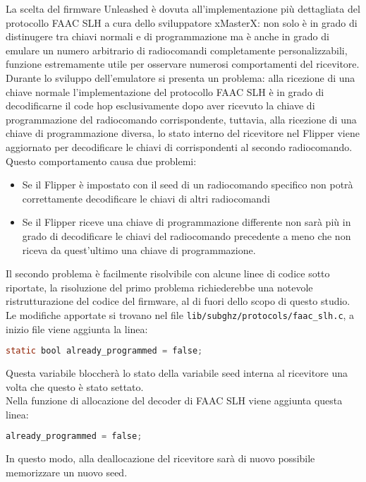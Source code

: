 La scelta del firmware Unleashed è dovuta all’implementazione più dettagliata del protocollo FAAC SLH a cura dello sviluppatore xMasterX: non solo è in grado di distinugere tra chiavi normali e di programmazione ma è anche in grado di emulare un numero arbitrario di radiocomandi completamente personalizzabili, funzione estremamente utile per osservare numerosi comportamenti del ricevitore.\\
Durante lo sviluppo dell’emulatore si presenta un problema: alla ricezione di una chiave normale l’implementazione del protocollo FAAC SLH è in grado di decodificarne il code hop esclusivamente dopo aver ricevuto la chiave di programmazione del radiocomando corrispondente, tuttavia, alla ricezione di una chiave di programmazione diversa, lo stato interno del ricevitore nel Flipper viene aggiornato per decodificare le chiavi di corrispondenti al secondo radiocomando. Questo comportamento causa due problemi:
\begin{itemize}
  \item Se il Flipper è impostato con il seed di un radiocomando specifico non potrà correttamente decodificare le chiavi di altri radiocomandi
  \item Se il Flipper riceve una chiave di programmazione differente non sarà più in grado di decodificare le chiavi del radiocomando precedente a meno che non riceva da quest’ultimo una chiave di programmazione.
\end{itemize}
Il secondo problema è facilmente risolvibile con alcune linee di codice sotto riportate, la risoluzione del primo problema richiederebbe una notevole ristrutturazione del codice del firmware, al di fuori dello scopo di questo studio.\\
Le modifiche apportate si trovano nel file \texttt{lib/subghz/protocols/faac\_slh.c}, a inizio file viene aggiunta la linea:
\begin{lstlisting}[language=C]
  static bool already_programmed = false;
\end{lstlisting}
Questa variabile bloccherà lo stato della variabile seed interna al ricevitore una volta che questo è stato settato.\\
Nella funzione di allocazione del decoder di FAAC SLH viene aggiunta questa linea:
\begin{lstlisting}[language=C]
  already_programmed = false;
\end{lstlisting}
In questo modo, alla deallocazione del ricevitore sarà di nuovo possibile memorizzare un nuovo seed.\\
